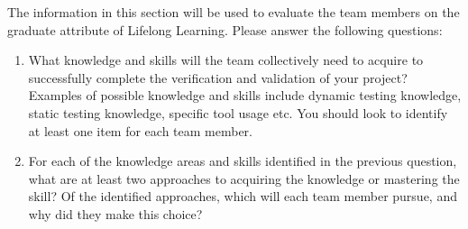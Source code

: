 \documentclass[12pt, titlepage]{article}
\begin{document}
The information in this section will be used to evaluate the team members on the
graduate attribute of Lifelong Learning.  Please answer the following questions:

\begin{enumerate}
  \item What knowledge and skills will the team collectively need to acquire to
  successfully complete the verification and validation of your project?
  Examples of possible knowledge and skills include dynamic testing knowledge,
  static testing knowledge, specific tool usage etc.  You should look to
  identify at least one item for each team member.
  \item For each of the knowledge areas and skills identified in the previous
  question, what are at least two approaches to acquiring the knowledge or
  mastering the skill?  Of the identified approaches, which will each team
  member pursue, and why did they make this choice?
\end{enumerate}
\end{document}
